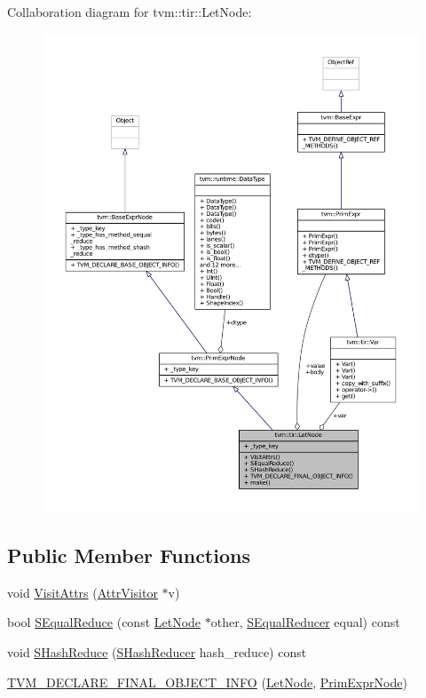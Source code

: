 Collaboration diagram for tvm\+:\+:tir\+:\+:Let\+Node\+:
\nopagebreak
\begin{figure}[H]
\begin{center}
\leavevmode
\includegraphics[width=350pt]{classtvm_1_1tir_1_1LetNode__coll__graph}
\end{center}
\end{figure}
\subsection*{Public Member Functions}
\begin{DoxyCompactItemize}
\item 
void \hyperlink{classtvm_1_1tir_1_1LetNode_aa152cd4cc5251565371c0ee9330f128f}{Visit\+Attrs} (\hyperlink{classtvm_1_1AttrVisitor}{Attr\+Visitor} $\ast$v)
\item 
bool \hyperlink{classtvm_1_1tir_1_1LetNode_ab1c9d795031c735d4d6526044b6b7007}{S\+Equal\+Reduce} (const \hyperlink{classtvm_1_1tir_1_1LetNode}{Let\+Node} $\ast$other, \hyperlink{classtvm_1_1SEqualReducer}{S\+Equal\+Reducer} equal) const 
\item 
void \hyperlink{classtvm_1_1tir_1_1LetNode_a5c26fcf996aac689188c3075d1286bed}{S\+Hash\+Reduce} (\hyperlink{classtvm_1_1SHashReducer}{S\+Hash\+Reducer} hash\+\_\+reduce) const 
\item 
\hyperlink{classtvm_1_1tir_1_1LetNode_a815217c289fc4caaf0c8bbe52d65a11e}{T\+V\+M\+\_\+\+D\+E\+C\+L\+A\+R\+E\+\_\+\+F\+I\+N\+A\+L\+\_\+\+O\+B\+J\+E\+C\+T\+\_\+\+I\+N\+FO} (\hyperlink{classtvm_1_1tir_1_1LetNode}{Let\+Node}, \hyperlink{classtvm_1_1PrimExprNode}{Prim\+Expr\+Node})
\end{DoxyCompactItemize}
